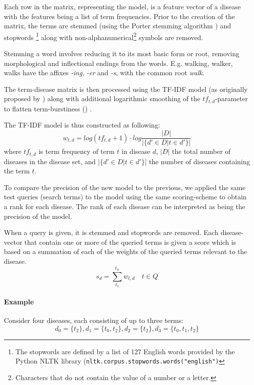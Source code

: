 \documentclass[10pt,letterpaper,final]{article}
\begin{document}

Each row in the matrix, representing the model, is a feature vector of a
disease with the features being a list of term frequencies. Prior to the
creation of the matrix, the terms are stemmed (using the Porter stemming
algorithm \cite{porterstemming}) and stopwords \footnote{The stopwords
are defined by a list of 127 English words provided by the Python NLTK
library (\texttt{nltk.corpus.stopwords.words("english")}} along with
non-alphanumerical\footnote{Characters that do not contain the value of
a number or a letter.} symbols are removed.

Stemming a word involves reducing it to its most basic form or root,
removing morphological and inflectional endings from the words. E.g.
walking, walker, walks have the affixes \textit{-ing}, \textit{-er} and
\textit{-s}, with the common root \textit{walk}.


The term-disease matrix is then processed using the
TF-IDF model (as originally proposed by \cite{tfidf}) along with
additional logarithmic smoothing of the $tf_{t,d}$-parameter to flatten
term-burstiness (\cite{burstiness}) .

The TF-IDF model is thus constructed as following:
\[
w_{t,d} = log(tf_{t,d}+1)\cdot log\frac{|D|}{|\{d'\in D|t\in d'\}|}
\]
where $tf_{t,d}$ is term frequency of term $t$ in disease $d$, $|D|$ 
the total number of diseases in the disease set, and $|\{d'\in D|t\in
d'\}|$ the number of diseases containing the term $t$.

To compare the precision of the new model to the previous, we applied
the same test queries (search terms) to the model using the same
scoring-scheme to obtain a rank for each disease. The rank of each
disease can be interpreted as being the precision of the model.

When a query is given, it is stemmed and stopwords are removed. Each
disease-vector that contain one or more of the queried terms is given a
score which is based on a summation of each of the weights of the
queried terms relevant to the disease.
\[
s_{d} = \displaystyle\sum\limits_{t_1}^{t_n} w_{t,d}\quad t \in Q
\]

\paragraph{Example}
Consider four diseases, each consisting of up to three terms:
\[
d_{0} = \{t_{2}\}, d_{1} = \{t_{0}, t_{2} \}, d_{2} = \{t_{2} \}, d_{3} = \{t_{0}, t_{1}, t_{2} \}
\]
\end{document}

